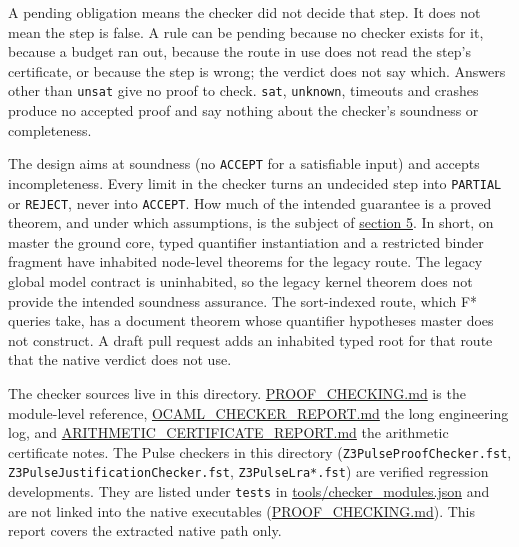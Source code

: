 \documentclass[10pt,a4paper]{article}
\begin{document}
A pending obligation means the checker did not decide that step. It does not mean the step is false. A rule can be pending because no checker exists for it, because a budget ran out, because the route in use does not read the step's certificate, or because the step is wrong; the verdict does not say which. Answers other than \texttt{unsat} give no proof to check. \texttt{sat}, \texttt{unknown}, timeouts and crashes produce no accepted proof and say nothing about the checker's soundness or completeness.

The design aims at soundness (no \texttt{ACCEPT} for a satisfiable input) and accepts incompleteness. Every limit in the checker turns an undecided step into \texttt{PARTIAL} or \texttt{REJECT}, never into \texttt{ACCEPT}. How much of the intended guarantee is a proved theorem, and under which assumptions, is the subject of \hyperref[sec:5-formal-assurance]{section 5}. In short, on master the ground core, typed quantifier instantiation and a restricted binder fragment have inhabited node-level theorems for the legacy route. The legacy global model contract is uninhabited, so the legacy kernel theorem does not provide the intended soundness assurance. The sort-indexed route, which F* queries take, has a document theorem whose quantifier hypotheses master does not construct. A draft pull request adds an inhabited typed root for that route that the native verdict does not use.

The checker sources live in this directory. \href{https://github.com/Z3Prover/z3/blob/8fbb275aba0472e862e289c7af1331b3bd5d512c/fstar/PROOF_CHECKING.md}{PROOF\_\allowbreak{}CHECKING.\allowbreak{}md} is the module-level reference, \href{https://github.com/Z3Prover/z3/blob/8fbb275aba0472e862e289c7af1331b3bd5d512c/fstar/OCAML_CHECKER_REPORT.md}{OCAML\_\allowbreak{}CHECKER\_\allowbreak{}REPORT.\allowbreak{}md} the long engineering log, and \href{https://github.com/Z3Prover/z3/blob/8fbb275aba0472e862e289c7af1331b3bd5d512c/fstar/ARITHMETIC_CERTIFICATE_REPORT.md}{ARITHMETIC\_\allowbreak{}CERTIFICATE\_\allowbreak{}REPORT.\allowbreak{}md} the arithmetic certificate notes. The Pulse checkers in this directory (\texttt{Z3PulseProofChec\allowbreak{}ker.\allowbreak{}fst}, \texttt{Z3PulseJustifica\allowbreak{}tionChecker.\allowbreak{}fst}, \texttt{Z3PulseLra*.\allowbreak{}fst}) are verified regression developments. They are listed under \texttt{tests} in \href{https://github.com/Z3Prover/z3/blob/8fbb275aba0472e862e289c7af1331b3bd5d512c/fstar/tools/checker_modules.json\#L24-L30}{tools/\allowbreak{}checker\_\allowbreak{}modules.\allowbreak{}json} and are not linked into the native executables (\href{https://github.com/Z3Prover/z3/blob/8fbb275aba0472e862e289c7af1331b3bd5d512c/fstar/PROOF_CHECKING.md\#L12-L17}{PROOF\_\allowbreak{}CHECKING.\allowbreak{}md}). This report covers the extracted native path only.
\end{document}

